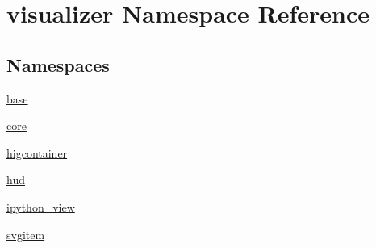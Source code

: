 \hypertarget{namespacevisualizer}{}\section{visualizer Namespace Reference}
\label{namespacevisualizer}
\subsection*{Namespaces}
\begin{DoxyCompactItemize}
\item 
 \hyperlink{namespacevisualizer_1_1base}{base}
\item 
 \hyperlink{namespacevisualizer_1_1core}{core}
\item 
 \hyperlink{namespacevisualizer_1_1higcontainer}{higcontainer}
\item 
 \hyperlink{namespacevisualizer_1_1hud}{hud}
\item 
 \hyperlink{namespacevisualizer_1_1ipython__view}{ipython\+\_\+view}
\item 
 \hyperlink{namespacevisualizer_1_1svgitem}{svgitem}
\end{DoxyCompactItemize}

